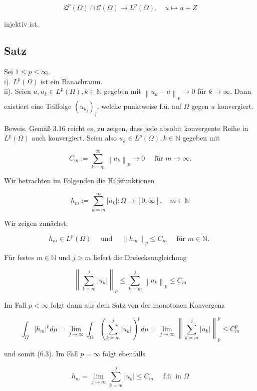 \documentclass[10pt, letterpaper]{article}
\begin{document}
$$
\mathfrak{L}^{p}(\Omega) \cap \mathcal{C}(\Omega) \rightarrow L^{p}(\Omega), \quad u \mapsto u+Z
$$

injektiv ist.

\subsection*{Satz}
Sei $1 \leq p \leq \infty$.\\
i). $L^{p}(\Omega)$ ist ein Banachraum.\\
ii). Seien $u, u_{k} \in L^{p}(\Omega), k \in \mathbb{N}$ gegeben mit $\left\|u_{k}-u\right\|_{p} \rightarrow 0$ für $k \rightarrow \infty$. Dann existiert eine Teilfolge $\left(u_{k_{j}}\right)_{j}$, welche punktweise f.ü. auf $\Omega$ gegen $u$ konvergiert.

Beweis. Gemäß 3.16 reicht es, zu zeigen, dass jede absolut konvergente Reihe in $L^{p}(\Omega)$ auch konvergiert. Seien also $u_{k} \in L^{p}(\Omega), k \in \mathbb{N}$ gegeben mit

$$
C_{m}:=\sum_{k=m}^{\infty}\left\|u_{k}\right\|_{p} \rightarrow 0 \quad \text { für } m \rightarrow \infty .
$$

Wir betrachten im Folgenden die Hilfsfunktionen

$$
h_{m}:=\sum_{k=m}^{\infty}\left|u_{k}\right|: \Omega \rightarrow[0, \infty], \quad m \in \mathbb{N}
$$

Wir zeigen zunächst:

$$
h_{m} \in L^{p}(\Omega) \quad \text { und } \quad\left\|h_{m}\right\|_{p} \leq C_{m} \quad \text { für } m \in \mathbb{N} \text {. }
$$

Für festes $m \in \mathbb{N}$ und $j>m$ liefert die Dreiecksungleichung

$$
\left\|\sum_{k=m}^{j}\left|u_{k}\right|\right\|_{p} \leq \sum_{k=m}^{j}\left\|u_{k}\right\|_{p} \leq C_{m}
$$

Im Fall $p<\infty$ folgt dann aus dem Satz von der monotonen Konvergenz

$$
\int_{\Omega}\left|h_{m}\right|^{p} d \mu=\lim _{j \rightarrow \infty} \int_{\Omega}\left(\sum_{k=m}^{j}\left|u_{k}\right|\right)^{p} d \mu=\lim _{j \rightarrow \infty}\left\|\sum_{k=m}^{j}\left|u_{k}\right|\right\|_{p}^{p} \leq C_{m}^{p}
$$

und somit (6.3). Im Fall $p=\infty$ folgt ebenfalls

$$
h_{m}=\lim _{j \rightarrow \infty} \sum_{k=m}^{j}\left|u_{k}\right| \leq C_{m} \quad \text { f.ü. in } \Omega
$$
\end{document}
